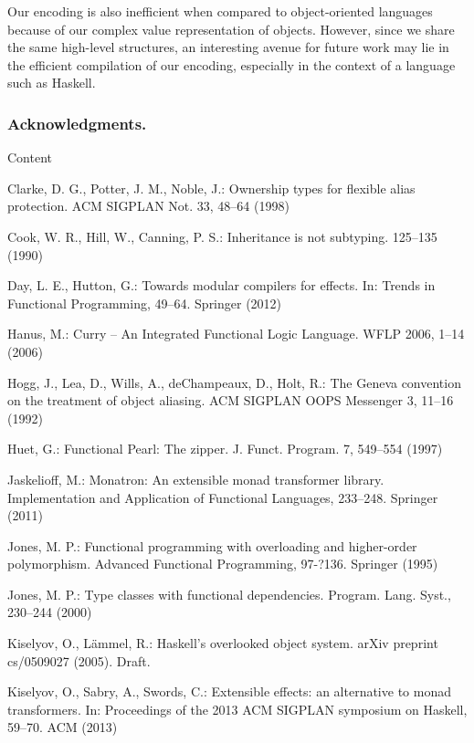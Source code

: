 \documentclass[runningheads,a4paper]{llncs}
\begin{document}
Our encoding is also inefficient when compared to object-oriented languages because of our complex value representation of objects. However, since we share the same high-level structures, an interesting avenue for future work may lie in the efficient compilation of our encoding, especially in the context of a language such as Haskell. 

\subsubsection*{Acknowledgments.} Content

\begin{thebibliography}{4}

 Clarke, D. G., Potter, J. M., Noble, J.: Ownership types for flexible alias protection. ACM SIGPLAN Not. 33, 48--64 (1998)

 Cook, W. R., Hill, W., Canning, P. S.: Inheritance is not subtyping. 125--135 (1990)

 Day, L. E., Hutton, G.: Towards modular compilers for effects. In: Trends in Functional Programming, 49--64. Springer (2012)
  
 Hanus, M.: Curry -- An Integrated Functional Logic Language. WFLP 2006, 1--14 (2006)

 Hogg, J., Lea, D., Wills, A., deChampeaux, D., Holt, R.: The Geneva convention on the treatment of object aliasing. ACM SIGPLAN OOPS Messenger 3, 11--16 (1992)

 Huet, G.: Functional Pearl: The zipper. J. Funct. Program. 7, 549--554 (1997)

 Jaskelioff, M.: Monatron: An extensible monad transformer library. Implementation and Application of Functional Languages, 233--248. Springer (2011)
  
 Jones, M. P.: Functional programming with overloading and higher-order polymorphism. Advanced Functional Programming, 97-?136. Springer (1995)
  
 Jones, M. P.: Type classes with functional dependencies. Program. Lang. Syst., 230--244 (2000)
  
 Kiselyov, O., L{\"a}mmel, R.: Haskell's overlooked object system. arXiv preprint cs/0509027 (2005). Draft.

 Kiselyov, O., Sabry, A., Swords, C.: Extensible effects: an alternative to monad transformers. In: Proceedings of the 2013 ACM SIGPLAN symposium on Haskell,
  59--70. ACM (2013)


\end{thebibliography}
\end{document}
